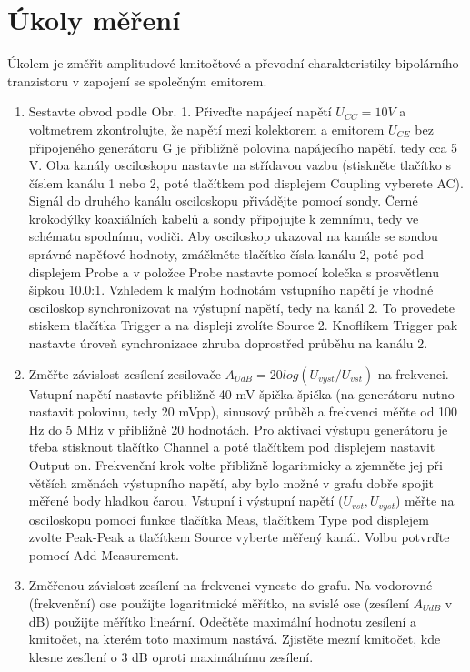 \documentclass[a4paper, czech]{article}
\begin{document}
\section{Úkoly měření}

Úkolem je změřit amplitudové kmitočtové a převodní charakteristiky bipolárního tranzistoru v zapojení se společným emitorem.

\begin{enumerate}
    \item Sestavte obvod podle Obr. 1. Přiveďte napájecí napětí $U_{CC} = 10 V$ a voltmetrem zkontrolujte, že napětí mezi kolektorem a emitorem $U_{CE}$ bez připojeného generátoru G je přibližně polovina napájecího napětí, tedy cca 5 V. Oba kanály osciloskopu nastavte na střídavou vazbu (stiskněte tlačítko s číslem kanálu 1 nebo 2, poté tlačítkem pod displejem Coupling vyberete AC). Signál do druhého kanálu osciloskopu přivádějte pomocí sondy. Černé krokodýlky koaxiálních kabelů a sondy připojujte k zemnímu, tedy ve schématu spodnímu, vodiči. Aby osciloskop ukazoval na kanále se sondou správné napěťové hodnoty, zmáčkněte tlačítko čísla kanálu 2, poté pod displejem Probe a v položce Probe nastavte pomocí kolečka s prosvětlenu šipkou 10.0:1. Vzhledem k malým hodnotám vstupního napětí je vhodné osciloskop synchronizovat na výstupní napětí, tedy na kanál 2. To provedete stiskem tlačítka Trigger a na displeji zvolíte Source 2. Knoflíkem Trigger pak nastavte úroveň synchronizace zhruba doprostřed průběhu na kanálu 2.   
    \item Změřte závislost zesílení zesilovače $A_{UdB} = 20 log ( U_{vyst} / U_{vst} )$ na frekvenci. Vstupní napětí nastavte přibližně 40 mV špička-špička (na generátoru nutno nastavit polovinu, tedy 20 mVpp), sinusový průběh a frekvenci měňte od 100 Hz do 5 MHz v přibližně 20 hodnotách. Pro aktivaci výstupu generátoru je třeba stisknout tlačítko Channel a poté tlačítkem pod displejem nastavit Output on. Frekvenční krok volte přibližně logaritmicky a zjemněte jej při větších změnách výstupního napětí, aby bylo možné v grafu dobře spojit měřené body hladkou čarou. Vstupní i výstupní napětí ($U_{vst}, U_{vyst}$) měřte na osciloskopu pomocí funkce tlačítka Meas, tlačítkem Type pod displejem zvolte Peak-Peak a tlačítkem Source vyberte měřený kanál. Volbu potvrďte pomocí Add Measurement.
    \item Změřenou závislost zesílení na frekvenci vyneste do grafu. Na vodorovné (frekvenční) ose použijte logaritmické měřítko, na svislé ose (zesílení $A_{UdB}$ v dB) použijte měřítko lineární. Odečtěte maximální hodnotu zesílení a kmitočet, na kterém toto maximum nastává. Zjistěte mezní kmitočet, kde klesne zesílení o 3 dB oproti maximálnímu zesílení.

\end{enumerate}
\end{document}
